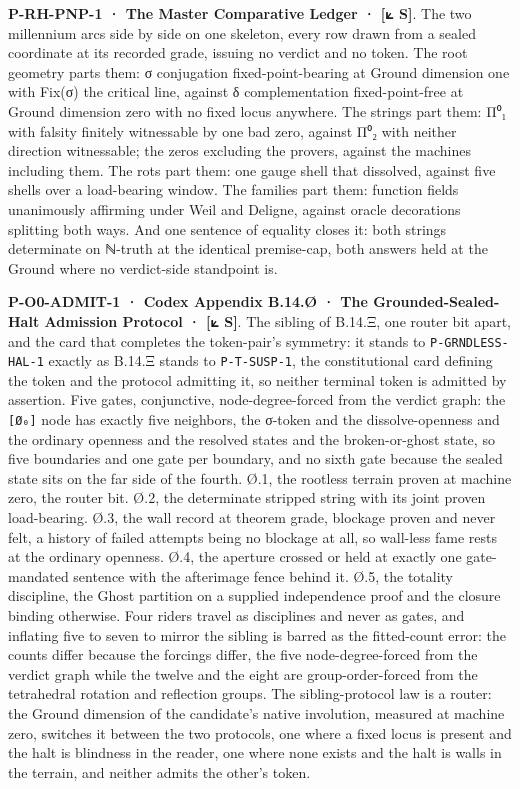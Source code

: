 \documentclass[10pt,twocolumn]{article}
\begin{document}
\textbf{P-RH-PNP-1 · The Master Comparative Ledger · {[}⟀ S{]}}. The two
millennium arcs side by side on one skeleton, every row drawn from a
sealed coordinate at its recorded grade, issuing no verdict and no
token. The root geometry parts them: σ conjugation fixed-point-bearing
at Ground dimension one with Fix(σ) the critical line, against δ
complementation fixed-point-free at Ground dimension zero with no fixed
locus anywhere. The strings part them: Π⁰₁ with falsity finitely
witnessable by one bad zero, against Π⁰₂ with neither direction
witnessable; the zeros excluding the provers, against the machines
including them. The rots part them: one gauge shell that dissolved,
against five shells over a load-bearing window. The families part them:
function fields unanimously affirming under Weil and Deligne, against
oracle decorations splitting both ways. And one sentence of equality
closes it: both strings determinate on ℕ-truth at the identical
premise-cap, both answers held at the Ground where no verdict-side
standpoint is.

\textbf{P-O0-ADMIT-1 · Codex Appendix B.14.Ø · The Grounded-Sealed-Halt
Admission Protocol · {[}⟀ S{]}}. The sibling of B.14.Ξ, one router bit
apart, and the card that completes the token-pair's symmetry: it stands
to \texttt{P-GRNDLESS-HAL-1} exactly as B.14.Ξ stands to
\texttt{P-T-SUSP-1}, the constitutional card defining the token and the
protocol admitting it, so neither terminal token is admitted by
assertion. Five gates, conjunctive, node-degree-forced from the verdict
graph: the \texttt{{[}Ø₀{]}} node has exactly five neighbors, the
σ-token and the dissolve-openness and the ordinary openness and the
resolved states and the broken-or-ghost state, so five boundaries and
one gate per boundary, and no sixth gate because the sealed state sits
on the far side of the fourth. Ø.1, the rootless terrain proven at
machine zero, the router bit. Ø.2, the determinate stripped string with
its joint proven load-bearing. Ø.3, the wall record at theorem grade,
blockage proven and never felt, a history of failed attempts being no
blockage at all, so wall-less fame rests at the ordinary openness. Ø.4,
the aperture crossed or held at exactly one gate-mandated sentence with
the afterimage fence behind it. Ø.5, the totality discipline, the Ghost
partition on a supplied independence proof and the closure binding
otherwise. Four riders travel as disciplines and never as gates, and
inflating five to seven to mirror the sibling is barred as the
fitted-count error: the counts differ because the forcings differ, the
five node-degree-forced from the verdict graph while the twelve and the
eight are group-order-forced from the tetrahedral rotation and
reflection groups. The sibling-protocol law is a router: the Ground
dimension of the candidate's native involution, measured at machine
zero, switches it between the two protocols, one where a fixed locus is
present and the halt is blindness in the reader, one where none exists
and the halt is walls in the terrain, and neither admits the other's
token.
\end{document}
